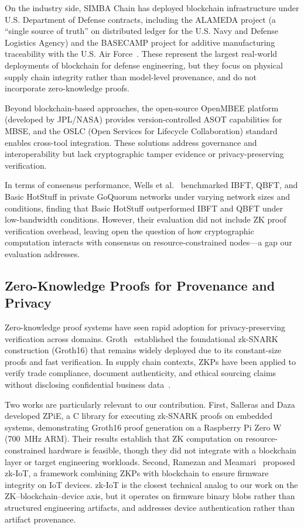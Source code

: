 On the industry side, SIMBA Chain has deployed blockchain infrastructure under U.S. Department of Defense contracts, including the ALAMEDA project (a ``single source of truth'' on distributed ledger for the U.S. Navy and Defense Logistics Agency) and the BASECAMP project for additive manufacturing traceability with the U.S. Air Force~\cite{simba_chain}.
These represent the largest real-world deployments of blockchain for defense engineering, but they focus on physical supply chain integrity rather than model-level provenance, and do not incorporate zero-knowledge proofs.

Beyond blockchain-based approaches, the open-source OpenMBEE platform (developed by JPL/NASA) provides version-controlled ASOT capabilities for MBSE, and the OSLC (Open Services for Lifecycle Collaboration) standard enables cross-tool integration.
These solutions address governance and interoperability but lack cryptographic tamper evidence or privacy-preserving verification.

In terms of consensus performance, Wells et al.~\cite{wells2023hotstuff_goquorum} benchmarked IBFT, QBFT, and Basic HotStuff in private GoQuorum networks under varying network sizes and conditions, finding that Basic HotStuff outperformed IBFT and QBFT under low-bandwidth conditions.
However, their evaluation did not include ZK proof verification overhead, leaving open the question of how cryptographic computation interacts with consensus on resource-constrained nodes---a gap our evaluation addresses.

\subsection{Zero-Knowledge Proofs for Provenance and Privacy}
\label{sec:rw-zk-provenance}

Zero-knowledge proof systems have seen rapid adoption for privacy-preserving verification across domains.
Groth~\cite{groth2016size} established the foundational zk-SNARK construction (Groth16) that remains widely deployed due to its constant-size proofs and fast verification.
In supply chain contexts, ZKPs have been applied to verify trade compliance, document authenticity, and ethical sourcing claims without disclosing confidential business data~\cite{zkp_supply_chain2024, maritime_zkp2025}.

Two works are particularly relevant to our contribution.
First, Salleras and Daza~\cite{salleras2021zpie} developed ZPiE, a C library for executing zk-SNARK proofs on embedded systems, demonstrating Groth16 proof generation on a Raspberry Pi Zero W (700~MHz ARM).
Their results establish that ZK computation on resource-constrained hardware is feasible, though they did not integrate with a blockchain layer or target engineering workloads.
Second, Ramezan and Meamari~\cite{ramezan2024zkiot} proposed zk-IoT, a framework combining ZKPs with blockchain to ensure firmware integrity on IoT devices.
zk-IoT is the closest technical analog to our work on the ZK--blockchain--device axis, but it operates on firmware binary blobs rather than structured engineering artifacts, and addresses device authentication rather than artifact provenance.

